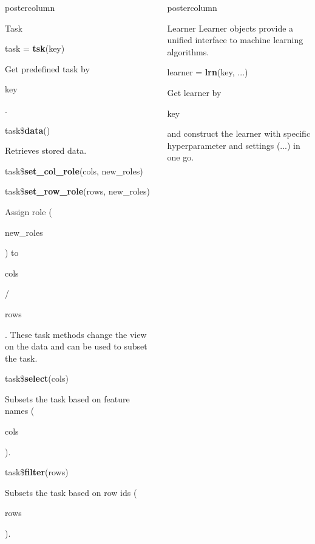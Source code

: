 \documentclass{beamer}
\newlength{\columnheight} %
\newcommand{\codeinline}[1]{\begin{codeboxinline}#1\end{codeboxinline}}
\begin{document}
\begin{frame}[fragile]{}
\begin{columns}
\begin{column}{.245\textwidth}
\begin{beamercolorbox}[center]{postercolumn}
\begin{minipage}{.98\textwidth}
{\begin{myblock}{Task}
							\begin{codebox}
								task = \textbf{tsk}(key)
							\end{codebox}
							Get predefined task by \codeinline{key}.
							\\
							\begin{codebox}
								task\$\textbf{data}()
							\end{codebox}
							Retrieves stored data.
							\\
							\begin{codebox}
								task\$\textbf{set\_col\_role}(cols, new\_roles)
							\end{codebox}
							\begin{codebox}
								task\$\textbf{set\_row\_role}(rows, new\_roles)
							\end{codebox}
							Assign role (\codeinline{new\_roles}) to \codeinline{cols} / \codeinline{rows}. These task methods change the view on the data and can be used to subset the task.
							\\
							\begin{codebox}
								task\$\textbf{select}(cols)
							\end{codebox}
							Subsets the task based on feature names (\codeinline{cols}).
							\\
							\begin{codebox}
								task\$\textbf{filter}(rows)
							\end{codebox}
							Subsets the task based on row ids (\codeinline{rows}).
						\end{myblock}
						\vfill
					}
				\end{minipage}
			\end{beamercolorbox}
		\end{column}
		\begin{column}{.245\textwidth}
			\begin{beamercolorbox}[center]{postercolumn}
				\begin{minipage}{.98\textwidth}
					\parbox[t][\columnheight]{\textwidth}{
						\begin{myblock}{Learner}
							Learner objects provide a unified interface to machine learning algorithms.
							\\
							\begin{codebox}
								learner = \textbf{lrn}(key, ...)
							\end{codebox}
							Get learner by \codeinline{key} and construct the learner with specific hyperparameter and settings (...) in one go.

\end{myblock}}
\end{minipage}
\end{beamercolorbox}
\end{column}
\end{columns}
\end{frame}
\end{document}
